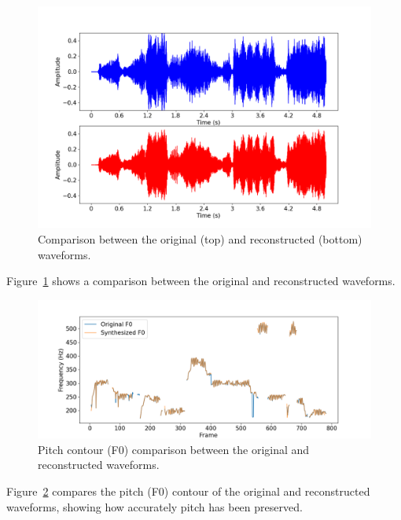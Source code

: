 \documentclass{article}
\begin{document}
\begin{figure}[!htbp]
    \centering
    \includegraphics[width=\textwidth]{data/plots/nessun_dorma_trimmed_original_vs_reconstructed_waveform.png}
    \caption{Comparison between the original (top) and reconstructed (bottom) waveforms.}
    \label{fig:original_vs_reconstructed_waveform}
\end{figure}

Figure~\ref{fig:original_vs_reconstructed_waveform} shows a comparison between the original and reconstructed waveforms.

\begin{figure}[!htbp]
    \centering
    \includegraphics[width=\textwidth]{data/plots/nessun_dorma_trimmed_f0_contour.png}
    \caption{Pitch contour (F0) comparison between the original and reconstructed waveforms.}
    \label{fig:f0_contour}
\end{figure}

Figure~\ref{fig:f0_contour} compares the pitch (F0) contour of the original and reconstructed waveforms, showing how accurately pitch has been preserved.
\end{document}
